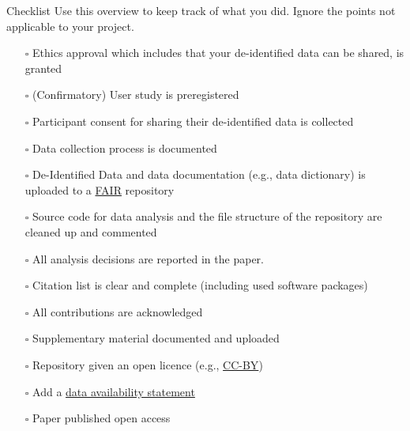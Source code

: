 
\begin{block}{Checklist}
  Use this overview to keep track of what you did. Ignore the points not applicable to your project.
  \begin{itemize}
    \item[$\square$]
    Ethics approval which includes that your de-identified data can be shared, is granted
    \item[$\square$]
    (Confirmatory) User study is preregistered
    \item[$\square$]
    Participant consent for sharing their de-identified data is collected
    \item[$\square$]
    Data collection process is documented
    \item[$\square$]
    De-Identified Data and data documentation (e.g., data dictionary) is uploaded to a \href{https://www.fairsfair.eu/news/fair-data-repositories-key-features-defined}{FAIR} repository
    \item[$\square$]
    Source code for data analysis and the file structure of the repository are cleaned up and commented
    \item[$\square$]
    All analysis decisions are reported in the paper.
    \item[$\square$]
    Citation list is clear and complete (including used software packages)
    \item[$\square$]
    All contributions are acknowledged
    \item[$\square$]
    Supplementary material documented and uploaded
    \item[$\square$]
    Repository given an open licence (e.g., \href{https://creativecommons.org/licenses/by/4.0/}{CC-BY})
    \item[$\square$] 
    Add a \href{https://www.cambridge.org/core/services/authors/open-data/data-availability-statements}{data availability statement}
    \item[$\square$]
    Paper published open access 
  \end{itemize}
\end{block}

